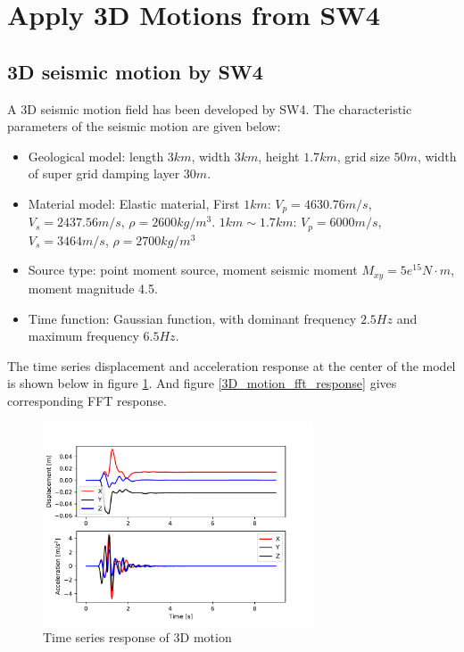 \clearpage
\newpage
\section{Apply 3D Motions from SW4}
\label{Apply_3D_Motions_from_SW4}

\subsection{3D seismic motion by SW4}
\label{3D seismic motion by SW4}

A 3D seismic motion field has been developed by SW4. The characteristic parameters of the seismic motion are given below: 

\begin{itemize}
  \item Geological model:  length $3km$, width 3$km$, height $1.7km$, grid size $50m$, width of super grid damping layer $30m$.  
  \item Material model: Elastic material, First $1km$: $V_p= 4630.76m/s$, $V_s=2437.56m/s$, $\rho = 2600kg/m^3$.  $1km\sim1.7km$: $V_p=6000m/s$, $V_s=3464m/s$, $\rho = 2700kg/m^3$ 
  \item Source type: point moment source, moment seismic moment $M_{xy} = 5e^{15} N \cdot m$, moment magnitude 4.5. 
  \item Time function: Gaussian function, with dominant frequency $2.5Hz$ and maximum frequency $6.5Hz$. 
\end{itemize}  

The time series displacement and acceleration response at the center of the model is shown below in figure \ref{3D_motion_time_response}. 
%
And figure \ref{3D_motion_fft_response} gives corresponding FFT response. 

\begin{figure}[H]
  \centering
  \includegraphics[width = 8cm]{./Figure-files/Day2/Apply_3D_Motions_from_SW4/3D_seismic_motion_by_SW4/time_response.pdf}
  \caption{Time series response of 3D motion}
  \label{3D_motion_time_response}
\end{figure}

